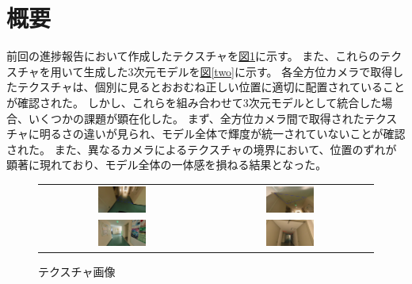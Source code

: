 \documentclass[]{jarticle}          %
\begin{document}
\section{概要}
前回の進捗報告において作成したテクスチャを\hyperref[one]{図\ref{one}}に示す。
また、これらのテクスチャを用いて生成した3次元モデルを\hyperref[two]{図\ref{two}}に示す。
各全方位カメラで取得したテクスチャは、個別に見るとおおむね正しい位置に適切に配置されていることが確認された。
しかし、これらを組み合わせて3次元モデルとして統合した場合、いくつかの課題が顕在化した。
まず、全方位カメラ間で取得されたテクスチャに明るさの違いが見られ、モデル全体で輝度が統一されていないことが確認された。
また、異なるカメラによるテクスチャの境界において、位置のずれが顕著に現れており、モデル全体の一体感を損ねる結果となった。
\begin{figure}[H]
  \begin{center}
    \begin{tabular}{cc}
      \includegraphics[width=0.3\textwidth]{figures/texture_0_0.png}&
      \includegraphics[width=0.3\textwidth]{figures/texture_0_5.png}\\
      \includegraphics[width=0.3\textwidth]{figures/texture_1_15.png}&
      \includegraphics[width=0.3\textwidth]{figures/texture_2_5.png}\\
    \end{tabular}
  \end{center}
  \caption{テクスチャ画像}
  \label{one}
\end{figure}
\end{document}
